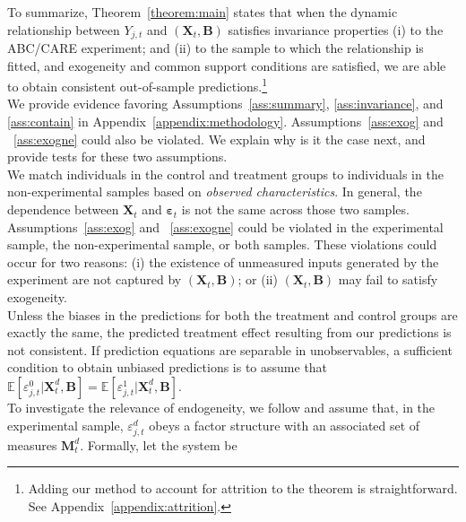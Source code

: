 \noindent To summarize, Theorem~\ref{theorem:main} states that when the dynamic relationship between $Y_{j,t}$ and $\left( \bm{X}_{t}, \bm{B} \right)$ satisfies invariance properties (i) to the ABC/CARE experiment; and (ii) to the sample to which the relationship is fitted, and exogeneity and common support conditions are satisfied, we are able to obtain consistent out-of-sample predictions.\footnote{Adding our method to account for attrition to the theorem is straightforward. See Appendix~\ref{appendix:attrition}.} \\

\noindent We provide evidence favoring Assumptions~\ref{ass:summary}, \ref{ass:invariance}, and \ref{ass:contain} in Appendix~\ref{appendix:methodology}. Assumptions~\ref{ass:exog} and ~\ref{ass:exogne} could also be violated. We explain why is it the case next, and provide tests for these two assumptions.\\

\noindent We match individuals in the control and treatment groups to individuals in the non-experimental samples based on \textit{observed characteristics}. In general, the dependence between $\bm{X}_{t}$ and $\bm{\varepsilon}_{t}$ is not the same across those two samples. Assumptions~\ref{ass:exog} and ~\ref{ass:exogne} could be violated in the experimental sample, the non-experimental sample, or both samples. These violations could occur for two reasons: (i) the existence of unmeasured inputs generated by the experiment are not captured by $\left( \bm{X}_{t}, \bm{B} \right)$; or (ii) $\left( \bm{X}_{t}, \bm{B} \right)$ may fail to satisfy exogeneity.\\

\noindent Unless the biases in the predictions for both the treatment and control groups are exactly the same, the predicted treatment effect resulting from our predictions is not consistent. If prediction equations are separable in unobservables, a sufficient condition to obtain unbiased predictions is to assume that $\mathbb{E} \left[ \varepsilon_{j,t}^0 | \bm{X}_{t}^d, \bm{B} \right] = \mathbb{E} \left[ \varepsilon_{j,t}^1 | \bm{X}_{t}^d, \bm{B} \right]$.\\

\noindent To investigate the relevance of endogeneity, we follow \citet{Heckman_Pinto_etal_2013_PerryFactor} and assume that, in the experimental sample, $\varepsilon_{j,t}^d$ obeys a factor structure with an associated set of measures $\bm{M}_{t}^d$. Formally, let the system be

